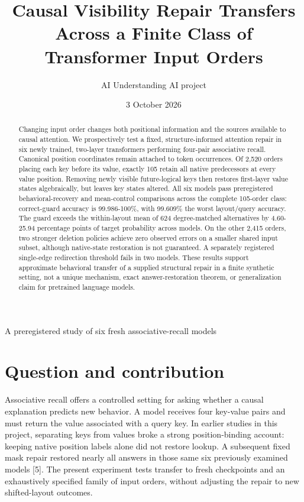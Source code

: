 \documentclass[10pt,letterpaper]{article}
\title{Causal Visibility Repair Transfers Across a Finite Class of Transformer Input Orders}
\author{AI Understanding AI project}
\date{3 October 2026}
\begin{document}
\fontsize{10.5}{14.1}\selectfont
\maketitle
\begin{center}
A preregistered study of six fresh associative-recall models
\end{center}
\begin{abstract}
Changing input order changes both positional information and the sources available to causal attention. We prospectively test a fixed, structure-informed attention repair in six newly trained, two-layer transformers performing four-pair associative recall. Canonical position coordinates remain attached to token occurrences. Of 2,520 orders placing each key before its value, exactly 105 retain all native predecessors at every value position. Removing newly visible future-logical keys then restores first-layer value states algebraically, but leaves key states altered. All six models pass preregistered behavioral-recovery and mean-control comparisons across the complete 105-order class: correct-guard accuracy is 99.986-100\%, with 99.609\% the worst layout/query accuracy. The guard exceeds the within-layout mean of 624 degree-matched alternatives by 4.60-25.94 percentage points of target probability across models. On the other 2,415 orders, two stronger deletion policies achieve zero observed errors on a smaller shared input subset, although native-state restoration is not guaranteed. A separately registered single-edge redirection threshold fails in two models. These results support approximate behavioral transfer of a supplied structural repair in a finite synthetic setting, not a unique mechanism, exact answer-restoration theorem, or generalization claim for pretrained language models.
\end{abstract}
\section{Question and contribution}
Associative recall offers a controlled setting for asking whether a causal explanation predicts new behavior. A model receives four key-value pairs and must return the value associated with a query key. In earlier studies in this project, separating keys from values broke a strong position-binding account: keeping native position labels alone did not restore lookup. A subsequent fixed mask repair restored nearly all answers in those same six previously examined models [5]. The present experiment tests transfer to fresh checkpoints and an exhaustively specified family of input orders, without adjusting the repair to new shifted-layout outcomes.
\end{document}
